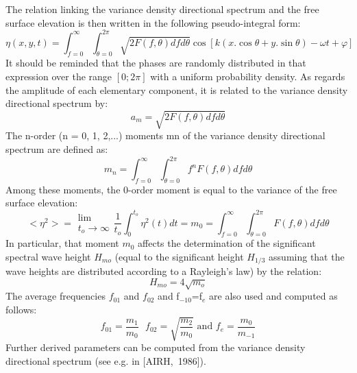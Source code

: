  The relation linking the variance density directional spectrum and the free surface elevation is then written in the following pseudo-integral form:
\begin{equation} \label{GrindEQ__2_9_}
\eta (x,y,t)=\int _{f=0}^{\infty }\int _{\theta =0}^{2\pi } \sqrt{2F(f,\theta )dfd\theta }  \cos \left[k\left(x.\cos \theta +y.\sin \theta \right)-\omega t+\varphi \right]
\end{equation}
It should be reminded that the phases are randomly distributed in that expression over the range $[0;2\pi]$ with a uniform probability density. As regards the amplitude of each elementary component, it is related to the variance density directional spectrum by:
\begin{equation} \label{GrindEQ__2_10_}
a_{m} =\sqrt{2F(f,\theta )dfd\theta }
\end{equation}
The n-order (n = 0, 1, 2,...) moments mn of the variance density directional spectrum are defined as:
\begin{equation} \label{GrindEQ__2_11_}
m_{n} =\int _{f=0}^{\infty }\int _{\theta =0}^{2\pi }  f^{n} F(f,\theta )dfd\theta
\end{equation}
Among these moments, the 0-order moment is equal to the variance of the free surface elevation:
\begin{equation} \label{GrindEQ__2_12_}
<\eta ^{2} >=\begin{array}{c} {\lim } \\ {t_{o} \to \infty } \end{array}\frac{1}{t_{o} } \int _{0}^{t_{o} }\eta ^{2} (t)dt =m_{0} =\int _{f=0}^{\infty }\int _{\theta =0}^{2\pi }  F(f,\theta )dfd\theta
\end{equation}
In particular, that moment $m_0$ affects the determination of the significant spectral wave height $H_{mo}$ (equal to the significant height $H_{1/3}$ assuming that the wave heights are distributed according to a Rayleigh's law) by the relation:
\begin{equation} \label{GrindEQ__2_13_}
H_{mo} =4\sqrt{m_{o} }
\end{equation}
The average frequencies $f_{01} $ and $f_{02} $ and f${}_{-10}$=f${}_{e}$ are also used and computed as follows:
\begin{equation} \label{GrindEQ__2_14_}
f_{01} =\frac{m_{1} }{m_{0} } \mbox{ }  f_{02} =\sqrt{\frac{m_{2} }{m_{0} } } \mbox{ and }  f_{e} =\frac{m_{0} }{m_{-1} }
\end{equation}
Further derived parameters can be computed from the variance density directional spectrum (see e.g. in [AIRH,~1986]).


